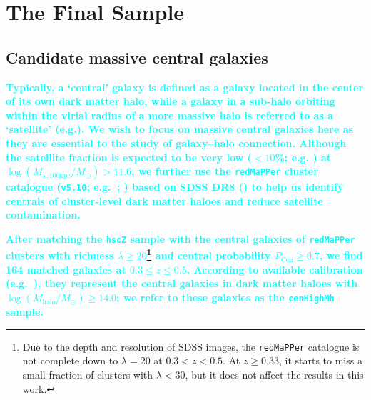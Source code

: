 \documentclass[fleqn,usenatbib]{mnras}
\def\redm{\texttt{redMaPPer}}
\def\rbcg{\texttt{cenHighMh}}
\def\logmtot{{$\log (M_{\star,100\mathrm{kpc}}/M_{\odot})$}}
\newcommand{\song}[1]{\textcolor{cyan}{\textbf{#1}}}
\begin{document}
\section{The Final Sample}
    \label{sec:final}
    
\subsection{Candidate massive central galaxies}
    \label{ssec:redmapper}
    
    \song{
    Typically, a `central' galaxy is defined as a galaxy located in the center of 
    its own dark matter halo, while a galaxy in a sub-halo orbiting within 
    the virial radius of a more massive halo is referred to as a `satellite' 
    (e.g.\citealt{Yang2007}).
    We wish to focus on massive central galaxies here as they are essential
    to the study of galaxy--halo connection.
    Although the satellite fraction is expected to be very low ($<10$\%; e.g. 
    \citealt{Reid2014, Hoshino2015, Saito2016}) at \logmtot{}$> 11.6$, we further use 
    the \redm{} cluster catalogue (\texttt{v5.10}; e.g.\ \citealt{Rykoff2014}; 
    \citealt{Rozo2015b}) based on SDSS DR8 (\citealt{SDSS-DR8}) to help us 
    identify centrals of cluster-level dark matter haloes and reduce satellite
    contamination.
    }
    
    \song{    
    After matching the \texttt{hscZ} sample with the central galaxies of \redm{} 
    clusters with richness $\lambda \geq 20$\footnote{Due to the depth and 
    resolution of SDSS images, the \redm{} catalogue is not complete down to 
    $\lambda=20$ at $0.3 < z < 0.5$.  
    At $z \geq 0.33$, it starts to miss a small fraction of clusters with 
    $\lambda < 30$, but it does not affect the results in this work.}
    and central probability $P_{\mathrm{Cen}} \geq 0.7$, we find 164 matched galaxies 
    at $0.3 \leq z \leq 0.5$.
    According to available calibration (e.g.\ \citealt{Saro2015, Farahi2016, 
    Simet2016, Melchior2016}), they represent the central galaxies in dark matter 
    haloes with $\log (M_{\mathrm{halo}}/M_{\odot}) \geq 14.0$; we refer to these 
    galaxies as the \rbcg{} sample. 
    }
\end{document}
